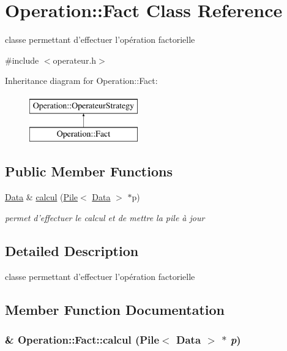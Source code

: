 \hypertarget{classOperation_1_1Fact}{
\section{Operation::Fact Class Reference}
\label{classOperation_1_1Fact}
}


classe permettant d'effectuer l'opération factorielle  




{\ttfamily \#include $<$operateur.h$>$}

Inheritance diagram for Operation::Fact:\begin{figure}[H]
\begin{center}
\leavevmode
\includegraphics[height=2cm]{classOperation_1_1Fact}
\end{center}
\end{figure}
\subsection*{Public Member Functions}
\begin{DoxyCompactItemize}
\item 
\hyperlink{classNombre_1_1Data}{Data} \& \hyperlink{classOperation_1_1Fact_ae6eeb0c3de361ee31794f78b5642a325}{calcul} (\hyperlink{classPile}{Pile}$<$ \hyperlink{classNombre_1_1Data}{Data} $>$ $\ast$p)
\begin{DoxyCompactList}\small\item\em permet d'effectuer le calcul et de mettre la pile à jour \item\end{DoxyCompactList}\end{DoxyCompactItemize}


\subsection{Detailed Description}
classe permettant d'effectuer l'opération factorielle 

\subsection{Member Function Documentation}
\hypertarget{classOperation_1_1Fact_ae6eeb0c3de361ee31794f78b5642a325}{
\subsubsection[{calcul}]{\& Operation::Fact::calcul ({\bf Pile}$<$ {\bf Data} $>$ $\ast$ {\em p})}}
\label{classOperation_1_1Fact_ae6eeb0c3de361ee31794f78b5642a325}


